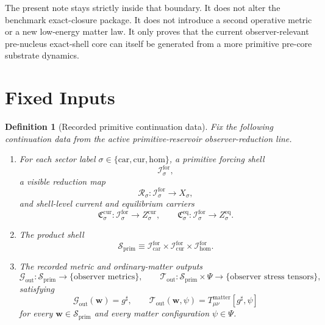 \documentclass[11pt]{article}
\newcommand{\CompletedMetric}{g^{\sharp}}
\newcommand{\MatterSpace}{\Psi}
\newcommand{\Car}{\mathrm{car}}
\newcommand{\Cur}{\mathrm{cur}}
\newcommand{\Hom}{\mathrm{hom}}
\newcommand{\ForSpace}[1]{\mathcal I_{#1}^{\mathrm{for}}}
\newcommand{\PrimShell}{\mathcal S_{\mathrm{prim}}}
\newcommand{\Reduction}[1]{\mathcal R_{#1}}
\newcommand{\CurrentCarrier}[1]{\mathfrak C_{#1}^{\mathrm{cur}}}
\newcommand{\EqCarrier}[1]{\mathfrak C_{#1}^{\mathrm{eq}}}
\newcommand{\MetricOut}{\mathscr G_{\mathrm{out}}}
\newcommand{\MatterOut}{\mathscr T_{\mathrm{out}}}
\newtheorem{definition}{Definition}
\begin{document}
The present note stays strictly inside that boundary. It does not alter the benchmark exact-closure package. It does not introduce a second operative metric or a new low-energy matter law. It only proves that the current observer-relevant pre-nucleus exact-shell core can itself be generated from a more primitive pre-core substrate dynamics.

\section{Fixed Inputs}

\begin{definition}[Recorded primitive continuation data]
\label{def:fixed}
Fix the following continuation data from the active primitive-reservoir observer-reduction line.
\begin{enumerate}
    \item For each sector label \(\sigma\in\{\Car,\Cur,\Hom\}\), a primitive forcing shell
    \[
    \ForSpace{\sigma},
    \]
    a visible reduction map
    \[
    \Reduction{\sigma}:\ForSpace{\sigma}\to X_{\sigma},
    \]
    and shell-level current and equilibrium carriers
    \[
    \CurrentCarrier{\sigma}:\ForSpace{\sigma}\to Z_{\sigma}^{\mathrm{cur}},
    \qquad
    \EqCarrier{\sigma}:\ForSpace{\sigma}\to Z_{\sigma}^{\mathrm{eq}}.
    \]
    \item The product shell
    \[
    \PrimShell
    \equiv
    \ForSpace{\Car}\times \ForSpace{\Cur}\times \ForSpace{\Hom}.
    \]
    \item The recorded metric and ordinary-matter outputs
    \[
    \MetricOut:\PrimShell\to\{\text{observer metrics}\},
    \qquad
    \MatterOut:\PrimShell\times\MatterSpace\to\{\text{observer stress tensors}\},
    \]
    satisfying
    \begin{equation}
    \MetricOut(\mathbf w)=\CompletedMetric,
    \qquad
    \MatterOut(\mathbf w,\psi)
    =
    T_{\mu\nu}^{\mathrm{matter}}[\CompletedMetric,\psi]
    \label{eq:fixedoutputs}
    \end{equation}
    for every \(\mathbf w\in\PrimShell\) and every matter configuration \(\psi\in\MatterSpace\).
\end{enumerate}
\end{definition}
\end{document}
